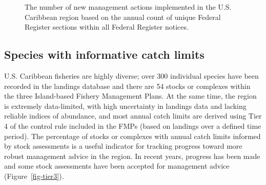 \documentclass[
  letterpaper,
  oneside,
  open=any]{scrbook}
\begin{document}
\begin{figure}


\caption{\label{fig-FR}The number of new management actions implemented
in the U.S. Caribbean region based on the annual count of unique Federal
Register sections within all Federal Register notices.}

\end{figure}%

\subsection{Species with informative catch
limits}\label{species-with-informative-catch-limits}

U.S. Caribbean fisheries are highly diverse; over 300 individual species
have been recorded in the landings database and there are 54 stocks or
complexes within the three Island-based Fishery Management Plans. At the
same time, the region is extremely data-limited, with high uncertainty
in landings data and lacking reliable indices of abundance, and most
annual catch limits are derived using Tier 4 of the control rule
included in the FMPs (based on landings over a defined time period). The
percentage of stocks or complexes with annual catch limits informed by
stock assessments is a useful indicator for tracking progress toward
more robust management advice in the region. In recent years, progress
has been made and some stock assessments have been accepted for
management advice (Figure~\ref{fig-tier3}).
\end{document}
